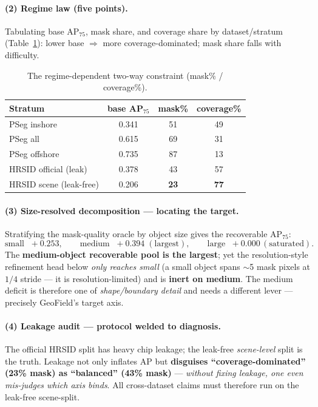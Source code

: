 \documentclass[11pt,a4paper]{article}
\begin{document}
\paragraph{(2) Regime law (five points).} Tabulating base AP$_{75}$, mask share, and coverage share by
dataset/stratum (Table~\ref{tab:regime}): lower base $\Rightarrow$ more coverage-dominated; mask share
falls with difficulty.

\begin{table}[h]\centering\small
\caption{The regime-dependent two-way constraint (mask\% / coverage\%).}
\label{tab:regime}
\begin{tabular}{lccc}
\toprule
Stratum & base AP$_{75}$ & mask\% & coverage\% \\
\midrule
PSeg inshore        & 0.341 & 51 & 49 \\
PSeg all            & 0.615 & 69 & 31 \\
PSeg offshore       & 0.735 & 87 & 13 \\
HRSID official (leak) & 0.378 & 43 & 57 \\
HRSID scene (leak-free) & 0.206 & \textbf{23} & \textbf{77} \\
\bottomrule
\end{tabular}
\end{table}

\paragraph{(3) Size-resolved decomposition --- locating the target.} Stratifying the mask-quality
oracle by object size gives the recoverable AP$_{75}$:
\begin{equation}
\text{small } \;+0.253,\qquad \boxed{\text{medium }\;+0.394}\;(\text{largest}),\qquad \text{large } \;+0.000\,(\text{saturated}).
\end{equation}
The \textbf{medium-object recoverable pool is the largest}; yet the resolution-style refinement head
below \emph{only reaches small} (a small object spans $\sim$5 mask pixels at $1/4$ stride --- it is
resolution-limited) and is \textbf{inert on medium}. The medium deficit is therefore one of
\emph{shape/boundary detail} and needs a different lever --- precisely GeoField's target axis.

\paragraph{(4) Leakage audit --- protocol welded to diagnosis.} The official HRSID split has heavy chip
leakage; the leak-free \emph{scene-level} split is the truth. Leakage not only inflates AP but
\textbf{disguises ``coverage-dominated'' (23\% mask) as ``balanced'' (43\% mask)} --- \emph{without
fixing leakage, one even mis-judges which axis binds}. All cross-dataset claims must therefore run on
the leak-free scene-split.
\end{document}
